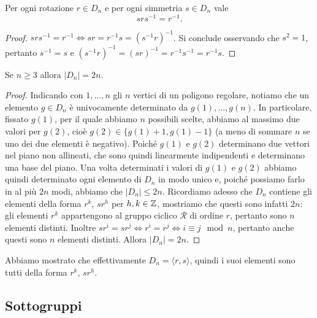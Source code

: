 \documentclass[11pt]{scrartcl}
\begin{document}
\begin{lemma}
    Per ogni rotazione $r \in D_n$ e per ogni simmetria $s \in D_n$ vale
    \[srs^{-1} = r^{-1}.\]
\end{lemma}

\begin{proof}
    $srs^{-1} = r^{-1} \iff sr = r^{-1}s = (s^{-1}r)^{-1}$. Si conclude
    osservando che $s^2 = 1$, pertanto $s^{-1} = s$ e $(s^{-1}r)^{-1} =
    (sr)^{-1} = r^{-1}s^{-1} = r^{-1}s$.
\end{proof}

\begin{proposition}
    \label{prop2.0}
    Se $n \geq 3$ allora $|D_n| = 2n$.
\end{proposition}

\begin{proof}
    Indicando con $1, \dots, n$ gli $n$ vertici di un poligono regolare, notiamo
    che un elemento $g \in D_n$ è univocamente determinato da $g(1), \dots, g(n)$.
    In particolare, fissato $g(1)$, per il quale abbiamo $n$ possibili scelte,
    abbiamo al massimo due valori per $g(2)$, cioè $g(2) \in \{g(1) + 1, g(1) - 1\}$
    (a meno di sommare $n$ se uno dei due elementi è negativo). Poiché $g(1)$
    e $g(2)$ determinano due vettori nel piano non allineati, che sono quindi
    linearmente indipendenti e determinano una base del piano. Una volta 
    determinati i valori di $g(1)$ e $g(2)$ abbiamo quindi determinato ogni
    elemento di $D_n$ in modo unico e, poiché possiamo farlo in al più $2n$ modi, 
    abbiamo che $|D_n| \leq 2n$. Ricordiamo adesso che $D_n$ contiene gli elementi
    della forma $r^k$, $sr^h$ per $h, k \in \mathbb Z$, mostriamo che questi sono 
    infatti $2n$: gli elementi $r^k$ appartengono al gruppo ciclico $\mathcal{R}$
    di ordine $r$, pertanto sono $n$ elementi distinti. Inoltre $sr^i = sr^j
    \iff r^i = r^j\iff i \equiv j \mod n$, pertanto anche questi sono $n$
    elementi distinti. Allora $|D_n| = 2n$.
\end{proof}

\begin{remark}
    Abbiamo mostrato che effettivamente $D_n = \langle r, s\rangle$, quindi i
    suoi elementi sono tutti della forma $r^k$, $sr^h$. 
\end{remark}


\subsection{Sottogruppi}
\end{document}
